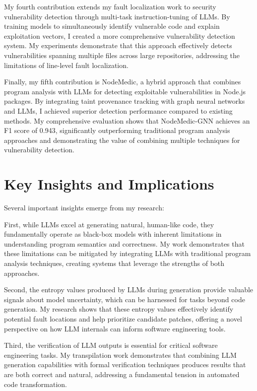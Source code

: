 My fourth contribution extends my fault localization work to security vulnerability detection through multi-task instruction-tuning of LLMs. By training models to simultaneously identify vulnerable code and explain exploitation vectors, I created a more comprehensive vulnerability detection system. My experiments demonstrate that this approach effectively detects vulnerabilities spanning multiple files across large repositories, addressing the limitations of line-level fault localization.

Finally, my fifth contribution is NodeMedic, a hybrid approach that combines program analysis with LLMs for detecting exploitable vulnerabilities in Node.js packages. By integrating taint provenance tracking with graph neural networks and LLMs, I achieved superior detection performance compared to existing methods. My comprehensive evaluation shows that NodeMedic-GNN achieves an F1 score of 0.943, significantly outperforming traditional program analysis approaches and demonstrating the value of combining multiple techniques for vulnerability detection.

\section{Key Insights and Implications}

Several important insights emerge from my research:

First, while LLMs excel at generating natural, human-like code, they fundamentally operate as black-box models with inherent limitations in understanding program semantics and correctness. My work demonstrates that these limitations can be mitigated by integrating LLMs with traditional program analysis techniques, creating systems that leverage the strengths of both approaches.

Second, the entropy values produced by LLMs during generation provide valuable signals about model uncertainty, which can be harnessed for tasks beyond code generation. My research shows that these entropy values effectively identify potential fault locations and help prioritize candidate patches, offering a novel perspective on how LLM internals can inform software engineering tools.

Third, the verification of LLM outputs is essential for critical software engineering tasks. My transpilation work demonstrates that combining LLM generation capabilities with formal verification techniques produces results that are both correct and natural, addressing a fundamental tension in automated code transformation.


